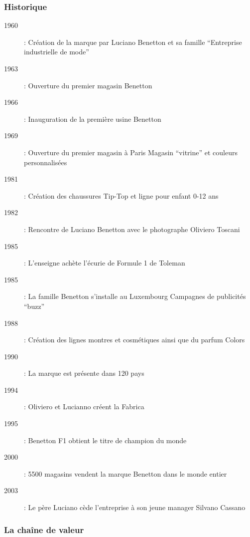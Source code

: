 	\subsubsection{Historique}
		\begin{description}
			\item[1960] : Création de la marque par Luciano Benetton et sa famille
				\subitem \enquote{Entreprise industrielle de mode}
			\item[1963] : Ouverture du premier magasin Benetton
			\item[1966] : Inauguration de la première usine Benetton
			\item[1969] : Ouverture du premier magasin à Paris
				\subitem Magasin \enquote{vitrine} et couleurs personnalisées
			\item[1981] : Création des chaussures Tip-Top et ligne pour enfant 0-12 ans
			\item[1982] : Rencontre de Luciano Benetton avec le photographe Oliviero Toscani
			\item[1985] : L'enseigne achète l'écurie de Formule 1 de Toleman
			\item[1985] : La famille Benetton s'installe au Luxembourg
				\subitem Campagnes de publicités \enquote{buzz}
			\item[1988] : Création des lignes montres et cosmétiques ainsi que du parfum Colors
			\item[1990] : La marque est présente dans 120 pays
			\item[1994] : Oliviero et Lucianno créent la Fabrica
			\item[1995] : Benetton F1 obtient le titre de champion du monde
			\item[2000] : 5500 magasins vendent la marque Benetton dans le monde entier
			\item[2003] : Le père Luciano cède l'entreprise à son jeune manager Silvano Cassano
		\end{description}
	\subsubsection{La chaîne de valeur}
